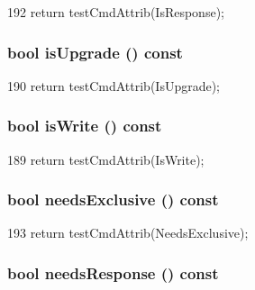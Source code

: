 \begin{DoxyCode}
192 { return testCmdAttrib(IsResponse); }
\end{DoxyCode}
\hypertarget{classMemCmd_aadb2fde0aba4a65b45d591e9ef5b6a63}{
\subsubsection[{isUpgrade}]{\setlength{\rightskip}{0pt plus 5cm}bool isUpgrade () const}}
\label{classMemCmd_aadb2fde0aba4a65b45d591e9ef5b6a63}



\begin{DoxyCode}
190 { return testCmdAttrib(IsUpgrade); }
\end{DoxyCode}
\hypertarget{classMemCmd_ab699d2f0d186312531fd1c279fd27b73}{
\subsubsection[{isWrite}]{\setlength{\rightskip}{0pt plus 5cm}bool isWrite () const}}
\label{classMemCmd_ab699d2f0d186312531fd1c279fd27b73}



\begin{DoxyCode}
189 { return testCmdAttrib(IsWrite); }
\end{DoxyCode}
\hypertarget{classMemCmd_aa8e449288b878ff3ff7f286eb4d28b6a}{
\subsubsection[{needsExclusive}]{\setlength{\rightskip}{0pt plus 5cm}bool needsExclusive () const}}
\label{classMemCmd_aa8e449288b878ff3ff7f286eb4d28b6a}



\begin{DoxyCode}
193 { return testCmdAttrib(NeedsExclusive); }
\end{DoxyCode}
\hypertarget{classMemCmd_a390c6cced05593f0a2c75a38a7a24fa9}{
\subsubsection[{needsResponse}]{\setlength{\rightskip}{0pt plus 5cm}bool needsResponse () const}}
\label{classMemCmd_a390c6cced05593f0a2c75a38a7a24fa9}



